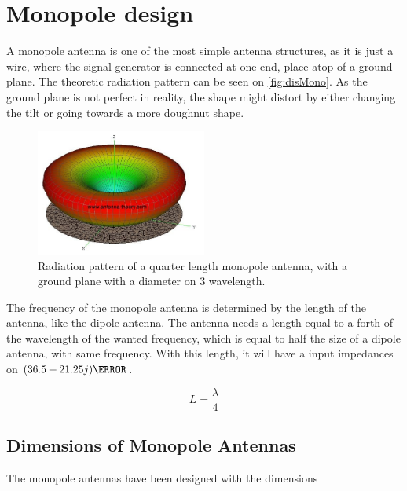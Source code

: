 \chapter{Monopole design}

A monopole antenna is one of the most simple antenna structures, as it is just a wire, where the signal generator is connected at one end, place atop of a ground plane. The theoretic radiation pattern can be seen on \autoref{fig:disMono}. As the ground plane is not perfect in reality, the shape might distort by either changing the tilt or going towards a more doughnut shape.

\begin{figure}[H]
\centering
\includegraphics[width=0.5\textwidth]{figure/disturbedMonopole.jpg}
\caption{Radiation pattern of a quarter length monopole antenna, with a ground plane with a diameter on 3 wavelength.}
\label{fig:disMono}
\end{figure}

The frequency of the monopole antenna is determined by the length of the antenna, like the dipole antenna. The antenna needs a length equal to a forth of the wavelength of the wanted frequency, which is equal to half the size of a dipole antenna, with same frequency. With this length, it will have a input impedances on $(36.5 + 21.25j) \ohm$.

\begin{equation}\label{eq:lengthMono}
L = \frac{\lambda}{4}
\end{equation}
\begin{where}
\end{where}

\section{Dimensions of Monopole Antennas}

The monopole antennas have been designed with the dimensions

